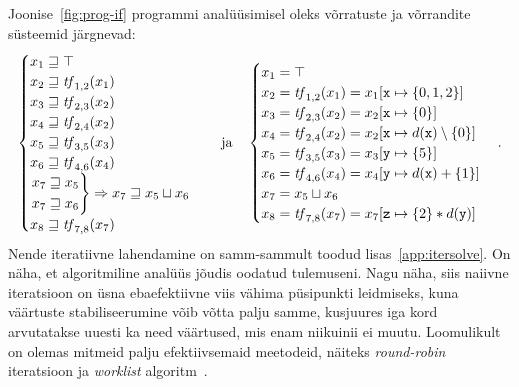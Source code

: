\documentclass[../thesis.tex]{subfiles}
\begin{document}
Joonise~\ref{fig:prog-if} programmi analüüsimisel oleks võrratuste ja võrrandite süsteemid järgnevad:
\[
	\begin{cases}
		x_1 \sqgeq \top \\
		x_2 \sqgeq \tf_{1,2}(x_1) \\
		x_3 \sqgeq \tf_{2,3}(x_2) \\
		x_4 \sqgeq \tf_{2,4}(x_2) \\
		x_5 \sqgeq \tf_{3,5}(x_3) \\
		x_6 \sqgeq \tf_{4,6}(x_4) \\
		\begin{rcases*}
			x_7 \sqgeq x_5 \\
			x_7 \sqgeq x_6
		\end{rcases*} \Rightarrow x_7 \sqgeq x_5 \sqcup x_6 \\
		x_8 \sqgeq \tf_{7,8}(x_7)
	\end{cases}
	\quad \text{ja} \quad
	\begin{cases}
		x_1 = \top \\
		x_2 = \tf_{1,2}(x_1) = x_1[\texttt{x} \mapsto \{0, 1, 2\}] \\
		x_3 = \tf_{2,3}(x_2) = x_2[\texttt{x} \mapsto \{0\}] \\
		x_4 = \tf_{2,4}(x_2) = x_2[\texttt{x} \mapsto d(\texttt{x}) \setminus \{0\}] \\
		x_5 = \tf_{3,5}(x_3) = x_3[\texttt{y} \mapsto \{5\}] \\
		x_6 = \tf_{4,6}(x_4) = x_4[\texttt{y} \mapsto d(\texttt{x}) + \{1\}] \\
		x_7 = x_5 \sqcup x_6 \\
		x_8 = \tf_{7,8}(x_7) = x_7[\texttt{z} \mapsto \{2\} * d(\texttt{y})]
	\end{cases}.
\]
Nende iteratiivne lahendamine on samm-sammult toodud lisas~\ref{app:itersolve}.
On näha, et algoritmiline analüüs jõudis oodatud tulemuseni.
Nagu näha, siis naiivne iteratsioon on üsna ebaefektiivne viis vähima püsipunkti leidmiseks, kuna väärtuste stabiliseerumine võib võtta palju samme, kusjuures iga kord arvutatakse uuesti ka need väärtused, mis enam niikuinii ei muutu. Loomulikult on olemas mitmeid palju efektiivsemaid meetodeid, näiteks \textit{round-robin} iteratsioon ja \textit{worklist} algoritm~\cite[24,83]{seidl_foundations}.
\end{document}
